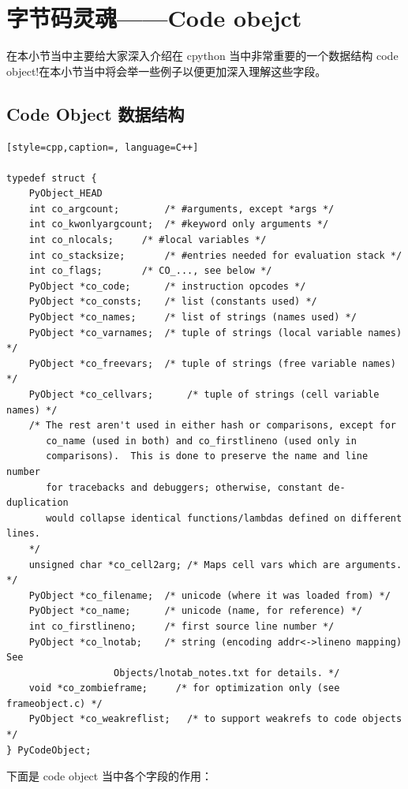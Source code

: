 \section{字节码灵魂——Code obejct}
在本小节当中主要给大家深入介绍在 cpython 当中非常重要的一个数据结构 code object!在本小节当中将会举一些例子以便更加深入理解这些字段。
\subsection{Code Object 数据结构}
\begin{lstlisting}[style=cpp,caption=, language=C++]

typedef struct {
    PyObject_HEAD
    int co_argcount;		/* #arguments, except *args */
    int co_kwonlyargcount;	/* #keyword only arguments */
    int co_nlocals;		/* #local variables */
    int co_stacksize;		/* #entries needed for evaluation stack */
    int co_flags;		/* CO_..., see below */
    PyObject *co_code;		/* instruction opcodes */
    PyObject *co_consts;	/* list (constants used) */
    PyObject *co_names;		/* list of strings (names used) */
    PyObject *co_varnames;	/* tuple of strings (local variable names) */
    PyObject *co_freevars;	/* tuple of strings (free variable names) */
    PyObject *co_cellvars;      /* tuple of strings (cell variable names) */
    /* The rest aren't used in either hash or comparisons, except for
       co_name (used in both) and co_firstlineno (used only in
       comparisons).  This is done to preserve the name and line number
       for tracebacks and debuggers; otherwise, constant de-duplication
       would collapse identical functions/lambdas defined on different lines.
    */
    unsigned char *co_cell2arg; /* Maps cell vars which are arguments. */
    PyObject *co_filename;	/* unicode (where it was loaded from) */
    PyObject *co_name;		/* unicode (name, for reference) */
    int co_firstlineno;		/* first source line number */
    PyObject *co_lnotab;	/* string (encoding addr<->lineno mapping) See
				   Objects/lnotab_notes.txt for details. */
    void *co_zombieframe;     /* for optimization only (see frameobject.c) */
    PyObject *co_weakreflist;   /* to support weakrefs to code objects */
} PyCodeObject;
\end{lstlisting}
下面是 code object 当中各个字段的作用：
